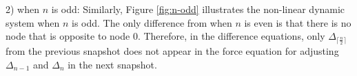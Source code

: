 2) when $n$ is odd:
Similarly, Figure \ref{fig:n-odd} illustrates the non-linear dynamic system when $n$ is odd. The only difference from when $n$ is even is that there is no node that is opposite to node 0. Therefore, in the difference equations, only $\Delta_{\lceil\frac{n}{2}\rceil}$ from the previous snapshot does not appear in the force equation for adjusting $\Delta_{n-1}$ and $\Delta_{n}$ in the next snapshot.
\begin{figure}[!t]
\centerline{
	\hfil
}
\end{figure}
